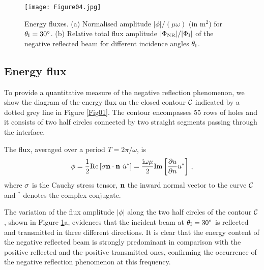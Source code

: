 \documentclass[10p]{article}
\begin{document}
\begin{figure}
\begin{center}
\texttt{[image: Figure04.jpg]}
\end{center}
\caption{\label{Fig04} Energy fluxes. (a) Normalised amplitude $|\phi|/(\mu\omega)$ (in $\mbox{m}^2$) for $\theta_\textup{I}=30^\circ$. (b) Relative total flux amplitude $|\Phi_\textup{NR}|/|\Phi_\textup{I}|$ of the negative reflected beam for different incidence angles $\theta_\textup{I}$.}
\end{figure}




\subsection{Energy flux}

To provide a quantitative measure of the negative reflection phenomenon, we show the diagram of the energy flux on the closed contour $\cal C$ indicated by a dotted grey line in Figure \ref{Fig01}. The contour encompasses 55 rows of holes and it consists of two half circles connected by two straight segments passing through the interface.



The flux, averaged over a period $T=2\pi/\omega$, is \cite{Brillouin1953,Nieves2021}
\begin{equation}
\label{eqn007}
\phi=\frac{1}{2}\mathrm{Re}\left[{\bf \sigma}{\bf n}\cdot{\bf n}\,\, \dot{u}^*\right]=\frac{\mathrm{i}\omega\mu}{2}\mathrm{Im}\left[\frac{\partial u}{\partial n} u^*\right]\,,
\end{equation}
where ${\bf \sigma}$ is the Cauchy stress tensor, ${\bf n}$ the inward normal vector to the curve $\cal C$ and $^*$ denotes the complex conjugate.  

The variation of the flux amplitude $|\phi|$ along the two half circles of the contour $\cal C$, shown in Figure \ref{Fig04}a, evidences that the incident beam at $\theta_\textup{I}=30^\circ$ is reflected and transmitted in three different directions.
It is clear that the energy content of the negative reflected beam is strongly predominant in comparison with the positive reflected and the positive transmitted ones, confirming the occurrence of the negative reflection phenomenon at this frequency.
\end{document}
